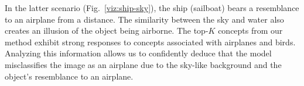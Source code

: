 In the latter scenario (Fig.~\ref{viz:ship-sky}), the ship (sailboat) bears a resemblance to an airplane from a distance. The similarity between the sky and water also creates an illusion of the object being airborne. The top-$K$ concepts from our method exhibit strong responses to concepts associated with airplanes and birds. Analyzing this information allows us to confidently deduce that the model misclassifies the image as an airplane due to the sky-like background and the object's resemblance to an airplane.


\begin{links}
\end{links}
